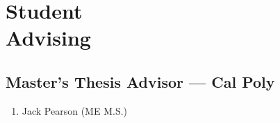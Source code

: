 \section{\texorpdfstring{Student \\[\baselineskip] Advising}{Student Advising}}
\hfill\vspace*{-2\baselineskip}

\subsection{Master's Thesis Advisor --- Cal Poly}
\begin{enumerate}[label=\arabic*.]
	\item Jack Pearson (ME M.S.) 
\end{enumerate}

\vspace*{\subsectionskip}

